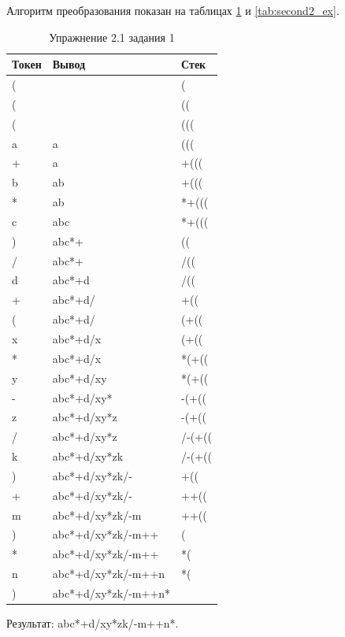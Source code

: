 \documentclass[a4paper, 14pt]{extarticle}
\begin{document}
Алгоритм преобразования показан на таблицах \ref{tab:second1_ex} и 
\ref{tab:second2_ex}.
\begin{longtable}[htpb]{|p{3cm}|p{5cm}|p{3cm}|}
  \caption{Упражнение 2.1 задания 1}
  \label{tab:second1_ex}
  \\
    \hline
    Токен & Вывод & Стек
    \\ \hline
    ( & & (
    \\ \hline
    ( & & ((
    \\ \hline
    ( & & (((
    \\ \hline
    a & a & (((
    \\ \hline
    + & a & +(((
    \\ \hline
    b & ab & +(((
    \\ \hline
    * & ab & *+(((
    \\ \hline
    c & abc & *+(((
    \\ \hline
    ) & abc*+ & ((
    \\ \hline
    / & abc*+ & /((
    \\ \hline
    d & abc*+d & /((
    \\ \hline
    + & abc*+d/ & +((
    \\ \hline
    ( & abc*+d/ & (+((
    \\ \hline
    x & abc*+d/x & (+((
    \\ \hline
    * & abc*+d/x & *(+((
    \\ \hline
    y & abc*+d/xy & *(+((
    \\ \hline
    - & abc*+d/xy* & -(+((
    \\ \hline
    z & abc*+d/xy*z & -(+((
    \\ \hline
    / & abc*+d/xy*z & /-(+((
    \\ \hline
    k & abc*+d/xy*zk & /-(+((
    \\ \hline
    ) & abc*+d/xy*zk/- & +((
    \\ \hline
    + & abc*+d/xy*zk/- & ++((
    \\ \hline
    m & abc*+d/xy*zk/-m & ++((
    \\ \hline
    ) & abc*+d/xy*zk/-m++ & (
    \\ \hline
    * & abc*+d/xy*zk/-m++ & *(
    \\ \hline
    n & abc*+d/xy*zk/-m++n & *(
    \\ \hline
    ) & abc*+d/xy*zk/-m++n*& 
    \\ \hline
\end{longtable}
Результат: abc*+d/xy*zk/-m++n*.
\end{document}
